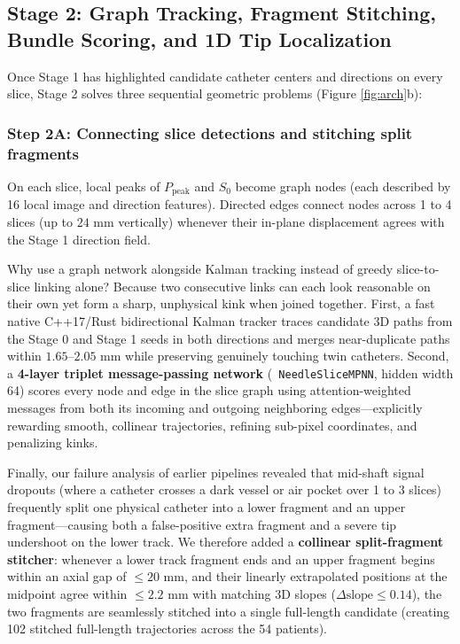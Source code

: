 \documentclass[
  11pt,
]{article}
\let\nforigtexttt\texttt
\renewcommand{\texttt}[1]{\nforigtexttt{\XeTeXinterchartokenstate=1 #1}}
\begin{document}
\subsection{Stage 2: Graph Tracking, Fragment Stitching, Bundle Scoring,
and 1D Tip
Localization}\label{stage-2-graph-tracking-fragment-stitching-bundle-scoring-and-1d-tip-localization}

Once Stage 1 has highlighted candidate catheter centers and directions
on every slice, Stage 2 solves three sequential geometric problems
(Figure \ref{fig:arch}b):

\subsubsection{Step 2A: Connecting slice detections and stitching split
fragments}\label{step-2a-connecting-slice-detections-and-stitching-split-fragments}

On each slice, local peaks of \(P_{\text{peak}}\) and \(S_0\) become
graph nodes (each described by 16 local image and direction features).
Directed edges connect nodes across 1 to 4 slices (up to
\(24\text{ mm}\) vertically) whenever their in-plane displacement agrees
with the Stage 1 direction field.

Why use a graph network alongside Kalman tracking instead of greedy
slice-to-slice linking alone? Because two consecutive links can each
look reasonable on their own yet form a sharp, unphysical kink when
joined together. First, a fast native C++17/Rust bidirectional Kalman
tracker traces candidate 3D paths from the Stage 0 and Stage 1 seeds in
both directions and merges near-duplicate paths within
\(1.65\text{--}2.05\text{ mm}\) while preserving genuinely touching twin
catheters. Second, a \textbf{4-layer triplet message-passing network}
(\texttt{NeedleSliceMPNN}, hidden width 64) scores every node and edge
in the slice graph using attention-weighted messages from both its
incoming and outgoing neighboring edges---explicitly rewarding smooth,
collinear trajectories, refining sub-pixel coordinates, and penalizing
kinks.

Finally, our failure analysis of earlier pipelines revealed that
mid-shaft signal dropouts (where a catheter crosses a dark vessel or air
pocket over 1 to 3 slices) frequently split one physical catheter into a
lower fragment and an upper fragment---causing both a false-positive
extra fragment and a severe tip undershoot on the lower track. We
therefore added a \textbf{collinear split-fragment stitcher}: whenever a
lower track fragment ends and an upper fragment begins within an axial
gap of \(\le 20\text{ mm}\), and their linearly extrapolated positions
at the midpoint agree within \(\le 2.2\text{ mm}\) with matching 3D
slopes (\(\Delta \text{slope} \le 0.14\)), the two fragments are
seamlessly stitched into a single full-length candidate (creating 102
stitched full-length trajectories across the 54 patients).
\end{document}
